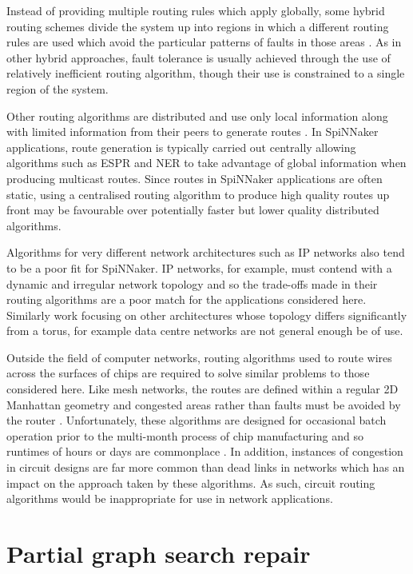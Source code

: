 			Instead of providing multiple routing rules which apply globally, some
			hybrid routing schemes divide the system up into regions in which a
			different routing rules are used which avoid the particular patterns of
			faults in those areas \cite{mejia06,boppana95}. As in other hybrid
			approaches, fault tolerance is usually achieved through the use of
			relatively inefficient routing algorithm, though their use is constrained
			to a single region of the system.
			
			Other routing algorithms are distributed and use only local information
			along with limited information from their peers to generate routes
			\cite{fick09b}. In SpiNNaker applications, route generation is typically
			carried out centrally allowing algorithms such as ESPR and NER to take
			advantage of global information when producing multicast routes. Since
			routes in SpiNNaker applications are often static, using a centralised
			routing algorithm to produce high quality routes up front may be
			favourable over potentially faster but lower quality distributed
			algorithms.
			
			Algorithms for very different network architectures such as IP networks
			also tend to be a poor fit for SpiNNaker. IP networks, for example, must
			contend with a dynamic and irregular network topology and so the
			trade-offs made in their routing algorithms are a poor match for the
			applications considered here.  Similarly work focusing on other
			architectures whose topology differs significantly from a torus, for
			example data centre networks \cite{guo08,liao12} are not general enough
			be of use.
			
			Outside the field of computer networks, routing algorithms used to route
			wires across the surfaces of chips are required to solve similar problems
			to those considered here. Like mesh networks, the routes are defined
			within a regular 2D Manhattan geometry and congested areas rather than
			faults must be avoided by the router \cite{kahng11}.  Unfortunately,
			these algorithms are designed for occasional batch operation prior to the
			multi-month process of chip manufacturing and so runtimes of hours or
			days are commonplace \cite{nam08}. In addition, instances of congestion
			in circuit designs are far more common than dead links in networks which
			has an impact on the approach taken by these algorithms. As such, circuit
			routing algorithms would be inappropriate for use in network
			applications.
	
	\section{Partial graph search repair}
		
